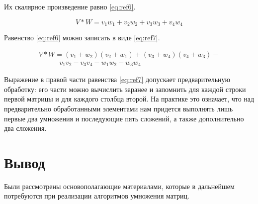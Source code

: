Их скалярное произведение равно  \ref{eq:ref6}.

\begin{equation}
	V * W = v_1w_1 + v_2w_2 + v_3w_3 + v_4w_4
	\label{eq:ref6}
\end{equation}

Равенство \ref{eq:ref6} можно записать в виде \ref{eq:ref7}.

\begin{equation}
	\begin{array}{l}
		V * W = (v_1 + w_2)(v_2 + w_1) + (v_3 + w_4)(v_4 + w_3) - \\
		\quad \quad \quad v_1v_2 - v_3v_4 - w_1w_2 - w_3w_4
	\end{array}
	\label{eq:ref7}
\end{equation}

Выражение в правой части равенства \ref{eq:ref7} допускает предварительную обработку:
его части можно вычислить заранее и запомнить для каждой строки первой матрицы и для каждого столбца второй. На практике это означает,
что над предварительно обработанными элементами нам придется выполнять лишь первые два умножения и последующие пять сложений, а
также дополнительно два сложения.

\section{Вывод}

Были рассмотрены основополагающие материалами, которые в дальнейшем потребуются при реализации алгоритмов умножения матриц.  



